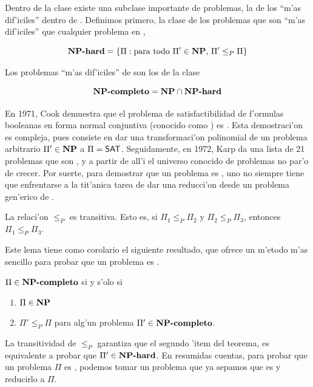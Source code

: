 Dentro de la clase  existe una subclase importante de problemas, la de los ``m'as dif'iciles'' dentro de . Definimos primero, la clase de los problemas que son ``m'as dif'iciles'' que cualquier problema en ,

\[\textnormal{\textbf{NP-hard}} = \{\Pi : \text{para todo } \Pi' \in \textnormal{\textbf{NP}} \text{, } \Pi' \leq_{P} \Pi\}\]

\noindent
Los problemas ``m'as dif'iciles'' de  son los de la clase

\[\textnormal{\textbf{NP-completo}} = \textnormal{\textbf{NP}} \cap \textnormal{\textbf{NP-hard}}\]

\noindent
En 1971, Cook \cite{Co71} demuestra que el problema de satisfactibilidad de f'ormulas booleanas en forma normal conjuntiva (conocido como ) es . Esta demostraci'on es compleja, pues consiste en dar una transformaci'on polinomial de un problema arbitrario $\Pi' \in \textnormal{\textbf{NP}}$ a $\Pi = \textnormal{\textsf{SAT}}$. Seguidamente, en 1972, Karp \cite{Ka72} da una lista de 21 problemas que son , y a partir de all'i el universo conocido de problemas  no par'o de crecer. Por suerte, para demostrar que un problema es , uno no siempre tiene que enfrentarse a la tit'anica tarea de dar una reducci'on desde un problema gen'erico de .

\begin{lemma}
La relaci'on $\leq_{P}$ es transitiva. Esto es, si $\Pi_1 \leq_{P} \Pi_2$ y $\Pi_2 \leq_{P} \Pi_3$, entonces $\Pi_1 \leq_{P} \Pi_3$.
\end{lemma}

\noindent
Este lema tiene como corolario el siguiente resultado, que ofrece un m'etodo m'as sencillo para probar que un problema es .

\begin{theorem}
$\Pi \in \textnormal{\textbf{NP-completo}}$ si y s'olo si
\begin{enumerate}
	\item $\Pi \in \textnormal{\textbf{NP}}$
	\item $\Pi' \leq_{P} \Pi$ para alg'un problema $\Pi' \in \textnormal{\textbf{NP-completo}}$.
\end{enumerate}
\end{theorem}

\noindent
La transitividad de $\leq_{P}$ garantiza que el segundo 'item del teorema, es equivalente a probar que $\Pi' \in \textnormal{\textbf{NP-hard}}$. En resumidas cuentas, para probar que un problema $\Pi$ es , podemos tomar un problema que ya sepamos que es  y reducirlo a $\Pi$.

